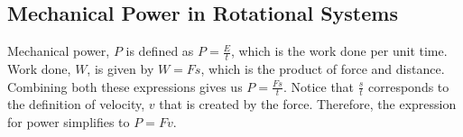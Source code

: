 \subsection{Mechanical Power in Rotational Systems}
Mechanical power, $P$ is defined as $P=\frac{E}{t}$, which is the work done per unit time. Work done, $W$, is given by $W=Fs$, which is the product of force and distance. Combining both these expressions gives us $P = \frac{Fs}{t}$. Notice that $\frac{s}{t}$ corresponds to the definition of velocity, $v$ that is created by the force. Therefore, the expression for power simplifies to $P=Fv$.